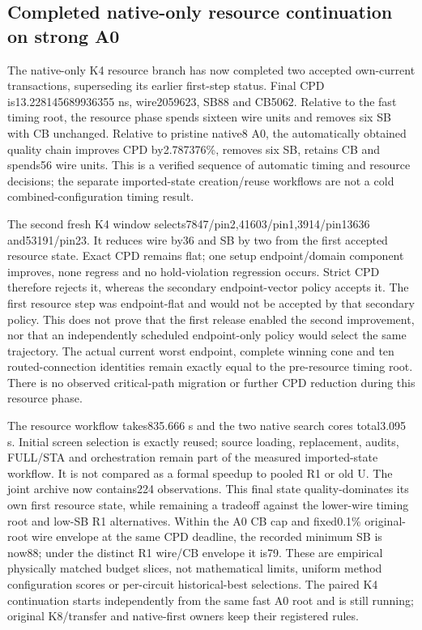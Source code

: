 \subsection{Completed native-only resource continuation on strong A0}
The native-only K4 resource branch has now completed two accepted own-current transactions, superseding its earlier first-step status. Final CPD is13.228145689936355 ns, wire2059623, SB88 and CB5062. Relative to the fast timing root, the resource phase spends sixteen wire units and removes six SB with CB unchanged. Relative to pristine native8 A0, the automatically obtained quality chain improves CPD by2.787376\%, removes six SB, retains CB and spends56 wire units. This is a verified sequence of automatic timing and resource decisions; the separate imported-state creation/reuse workflows are not a cold combined-configuration timing result.

The second fresh K4 window selects7847/pin2,41603/pin1,3914/pin13636 and53191/pin23. It reduces wire by36 and SB by two from the first accepted resource state. Exact CPD remains flat; one setup endpoint/domain component improves, none regress and no hold-violation regression occurs. Strict CPD therefore rejects it, whereas the secondary endpoint-vector policy accepts it. The first resource step was endpoint-flat and would not be accepted by that secondary policy. This does not prove that the first release enabled the second improvement, nor that an independently scheduled endpoint-only policy would select the same trajectory. The actual current worst endpoint, complete winning cone and ten routed-connection identities remain exactly equal to the pre-resource timing root. There is no observed critical-path migration or further CPD reduction during this resource phase.

The resource workflow takes835.666 s and the two native search cores total3.095 s. Initial screen selection is exactly reused; source loading, replacement, audits, FULL/STA and orchestration remain part of the measured imported-state workflow. It is not compared as a formal speedup to pooled R1 or old U. The joint archive now contains224 observations. This final state quality-dominates its own first resource state, while remaining a tradeoff against the lower-wire timing root and low-SB R1 alternatives. Within the A0 CB cap and fixed0.1\% original-root wire envelope at the same CPD deadline, the recorded minimum SB is now88; under the distinct R1 wire/CB envelope it is79. These are empirical physically matched budget slices, not mathematical limits, uniform method configuration scores or per-circuit historical-best selections. The paired K4 continuation starts independently from the same fast A0 root and is still running; original K8/transfer and native-first owners keep their registered rules.
